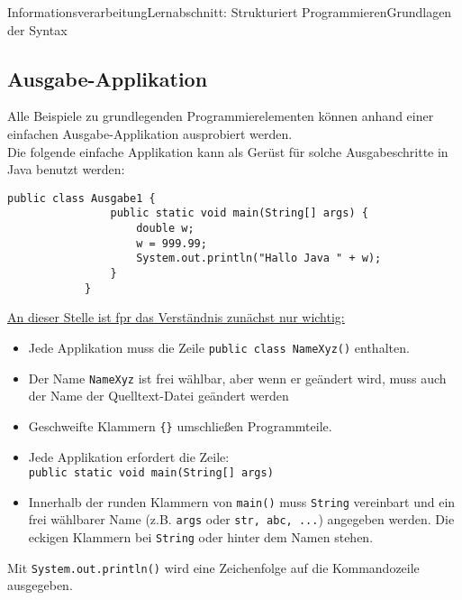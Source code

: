 \documentclass[11pt,oneside,openany,headings=optiontotoc,11pt,numbers=noenddot]{article}
\begin{document}
\begin{worksheet}{Informationsverarbeitung}{Lernabschnitt: Strukturiert Programmieren}{Grundlagen der Syntax}
		\subsection{Ausgabe-Applikation}
		Alle Beispiele zu grundlegenden Programmierelementen können anhand einer einfachen Ausgabe-Applikation ausprobiert werden.\\
		Die folgende \grqq{}einfache\grqq{} Applikation kann als Gerüst für solche Ausgabeschritte in Java benutzt werden:
		\begin{lstlisting}[style=Python]
			public class Ausgabe1 {
				public static void main(String[] args) {
					double w;
					w = 999.99;
					System.out.println("Hallo Java " + w);
				}
			}
		\end{lstlisting}
		\underline{An dieser Stelle ist fpr das Verständnis zunächst nur wichtig:}
		\begin{itemize}
			\item Jede Applikation muss die Zeile \lstinline[style=Python]|public class NameXyz()| enthalten.
			\item Der Name \lstinline[style=Python]|NameXyz| ist frei wählbar, aber wenn er geändert wird, muss auch der Name der Quelltext-Datei geändert werden
			\item Geschweifte Klammern \lstinline[style=Python]|{}| umschließen Programmteile.
			\item Jede Applikation erfordert die Zeile:\\
			\lstinline[style=Python]|public static void main(String[] args)|
			\item Innerhalb der runden Klammern von \lstinline[style=Python]|main()| muss \lstinline[style=Python]|String| vereinbart und ein frei wählbarer Name (z.B. \lstinline[style=Python]|args| oder \lstinline[style=Python]|str, abc, ...|) angegeben werden. Die eckigen Klammern bei \lstinline[style=Python]|String| oder hinter dem Namen stehen.
		\end{itemize}
		Mit \lstinline[style=Python]|System.out.println()| wird eine Zeichenfolge auf die Kommandozeile ausgegeben.
		

\end{worksheet}
\end{document}
